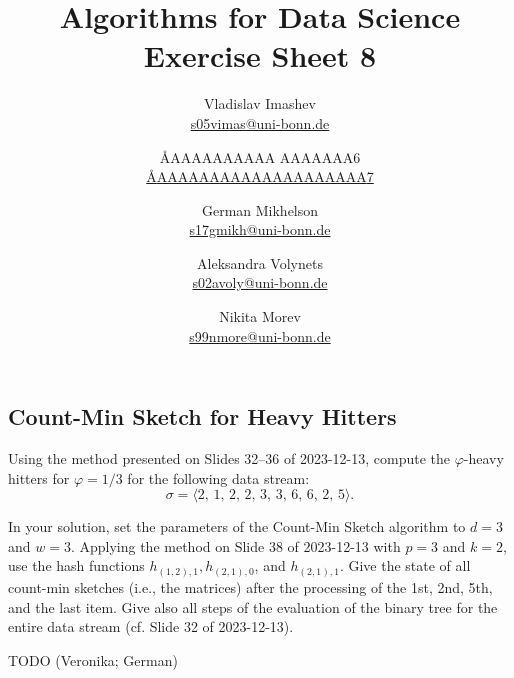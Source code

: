 \documentclass{article}
\title{Algorithms for Data Science \\ Exercise Sheet 8}
\author{
  Vladislav Imashev \\ \href{mailto:s05vimas@uni-bonn.de}{s05vimas@uni-bonn.de} \and
  \AA{AAAAAAAAAA AAAAAAA}{6} \\ \href{mailto:\AA{AAAAAAAAAAAAAAAAAAAA}{7}}{\AA{AAAAAAAAAAAAAAAAAAAA}{7}} \and
  German Mikhelson \\ \href{mailto:s17gmikh@uni-bonn.de}{s17gmikh@uni-bonn.de} \and
  Aleksandra Volynets \\ \href{mailto:s02avoly@uni-bonn.de}{s02avoly@uni-bonn.de} \and
  Nikita Morev \\ \href{mailto:s99nmore@uni-bonn.de}{s99nmore@uni-bonn.de}
}
\let\phi\varphi
\begin{document}
  \maketitle

  \setcounter{section}{8}
  \subsection{Count-Min Sketch for Heavy Hitters}
  \begin{centerframebox}
    Using the method presented on Slides 32--36 of 2023-12-13, compute the $\phi$-heavy
    hitters for $\phi = 1/3$ for the following data stream:
    $$\sigma = \langle2,\, 1,\, 2,\, 2,\, 3,\, 3,\, 6,\, 6,\, 2,\, 5\rangle.$$

    In your solution, set the parameters of the Count-Min Sketch algorithm to $d = 3$
    and $w = 3$. Applying the method on Slide 38 of 2023-12-13 with $p = 3$ and
    $k = 2$, use the hash functions $h_{(1,2),1}, h_{(2,1),0}$, and $h_{(2,1),1}$.
    Give the state of all count-min sketches (i.e., the matrices) after the processing
    of the 1st, 2nd, 5th, and the last item. Give also all steps of the evaluation of
    the binary tree for the entire data stream (cf. Slide 32 of 2023-12-13).
  \end{centerframebox}
  TODO (Veronika; German)
\end{document}
